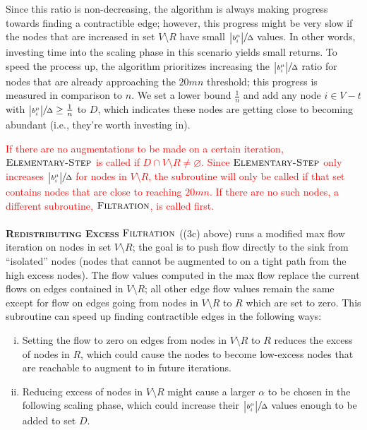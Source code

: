 \documentclass[11pt]{article}
\makeatletter
\let\comment\todo
\newcommand{\frank}[1]{\comment[nolist,color=blue!40]{@frank\\ #1}}
\theoremstyle{definition}
\theoremstyle{definition}
\theoremstyle{definition}
\newcommand{\filtration}{\textsc{Filtration}}
\newcommand{\es}{\textsc{Elementary-Step}}
\newcommand{\rewrite}[1]{\textcolor{red}{#1}}
\renewcommand{\todo}[1]{\hl{TODO: #1}}
\makeatother
\begin{document}
Since this ratio is non-decreasing, the algorithm is always making progress towards finding a
contractible edge; however, this progress might be very slow if the nodes that
are increased in set $V \setminus R$ have small $\sfrac{\abs{b_i^\mu}}{\Delta}$
values. In other words, investing time into the scaling phase in this scenario 
yields small returns. To speed the process up, the algorithm prioritizes increasing the
$\sfrac{\abs{b_i^\mu}}{\Delta}$ ratio for nodes that are already approaching the
$20mn$ threshold; this progress is measured in comparison to $n$. We set a lower
bound $\frac{1}{n}$ and add any node $i \in V-t$ with
$\sfrac{\abs{b_i^\mu}}{\Delta} \geq \frac{1}{n}$ to $D$, which indicates
these nodes are getting close to becoming abundant (i.e., they're worth investing
in).

\frank{Currently trying to move this}
\rewrite{
If there are no augmentations to be made on a certain iteration, $\es$ is called
if $D \cap V\setminus R \neq \varnothing$. 
Since $\es$ only increases
$\sfrac{\abs{b_i^\mu}}{\Delta}$ for nodes in $V\setminus R$, the subroutine will
only be called if that set contains nodes that are close to reaching $20mn$. If
there are no such nodes, a different subroutine, $\filtration$, is called first. 
}\\ \\
\textbf{\textsc{Redistributing Excess}} $\filtration$ ((3c) above) runs a modified max flow iteration on nodes in set $V \setminus R$;
the goal is to push flow directly to the sink from ``isolated'' nodes (nodes that cannot be augmented to on a tight path from the high excess nodes). The flow values computed in the max flow replace the current flows on
edges contained in $V \setminus R$; all other edge flow values remain the same
except for flow on edges going from nodes in $V \setminus R$  to $R$ which are set
to zero. This subroutine can speed up finding contractible edges
in the following ways:

\begin{enumerate}[(i),itemsep=0mm]
\item Setting the flow to zero on edges from nodes in $V\setminus R$ to $R$
	reduces the excess of nodes in $R$, which could cause the nodes to become
	low-excess nodes that are reachable to augment to in future iterations.
\item Reducing excess of nodes in $V \setminus R$ might cause a larger $\alpha$
	to be chosen in the following scaling phase, which could increase their
	$\sfrac{\abs{b_i^\mu}}{\Delta}$ values enough to be added to set $D$.
\end{enumerate}
\end{document}
